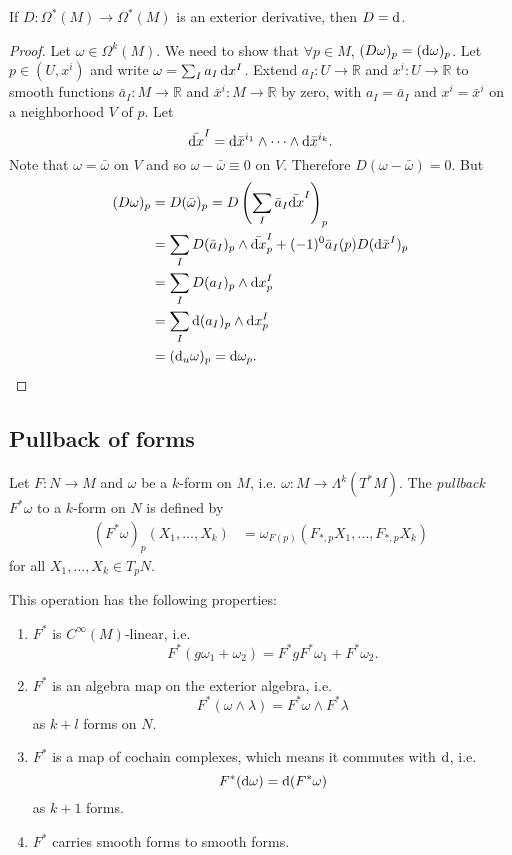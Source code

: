 \begin{prop}[Uniquenss of $D$]
If $D: \Omega^\ast(M) \to \Omega^\ast(M)$ is an exterior derivative,
then $D = \mathop{}\!\mathrm{d}$.
\end{prop}
\begin{proof}
Let $\omega \in \Omega^k(M)$. We need to show that $\forall p \in M$,
$(D\omega)_p = (\mathop{}\!\mathrm{d}\omega)_p$. Let
$p \in (U, x^i)$ and write $\omega = \sum_I a_I \mathop{}\!\mathrm{d} x^I$.
Extend $a_I : U \to \mathbb{R}$ and $x^i : U \to \mathbb{R}$ to smooth
functions $\bar{a}_I : M \to \mathbb{R}$ and $\bar{x}^i: M \to
\mathbb{R}$ by zero, with $a_I = \bar{a}_I$ and $x^i = \bar{x}^i$ on a
neighborhood $V$ of $p$. Let
$$
  \bar{\mathop{}\!\mathrm{d} x}^I
= \mathop{}\!\mathrm{d} \bar{x}^{i_1} \wedge \cdots \wedge \mathop{}\!\mathrm{d} \bar{x}^{i_k}.
$$
Note that $\omega = \bar{\omega}$ on $V$ and so
$\omega - \bar{\omega} \equiv 0$ on $V$. Therefore $D(\omega -
\bar{\omega}) = 0$. But
\begin{align*}
   (D \omega)_p
&= D(\bar{\omega})_p
 = D\left(
     \sum_I
       \bar{a}_I \bar{\dif x}^I
   \right)_p \\
&= \sum_I D(\bar{a}_I)_p \wedge \bar{\dif x}^I_p
 + (-1)^0 \bar{a}_I(p) D(\dif \bar{x}^I)_p \\
&= \sum_I
     D(a_I)_p \wedge \dif x^I_p \\
&= \sum_I
     \dif(a_I)_p \wedge \dif x^I_p \\
&= (\dif_u \omega)_p
 = \dif \omega_p.
\end{align*}
\end{proof}

\subsection{Pullback of forms}
Let $F : N \to M$ and $\omega$ be a $k$-form on $M$,
i.e. $\omega: M \to \Lambda^k(T^\ast M)$.
The \emph{pullback} $F^\ast \omega$ to a $k$-form on
$N$ is defined by
\begin{align*}
   (F^\ast\omega)_p
     (X_1, \dots, X_k)
&= \omega_{F(p)}
     (F_{\ast, p} X_1, \dots, F_{\ast, p} X_k)
\end{align*}
for all $X_1, \dots, X_k \in T_p N$.

This operation has the following properties:
\begin{enumerate}
  \item{
    $F^\ast$ is $C^\infty(M)$-linear, i.e.
    $$
      F^\ast(g \omega_1 + \omega_2)
    = F^\ast g F^\ast \omega_1 + F^\ast \omega_2.
    $$
  }
  \item{
    $F^\ast$ is an algebra map on the exterior algebra, i.e.
    $$
      F^\ast(\omega \wedge \lambda)
    = F^\ast \omega \wedge F^\ast \lambda
    $$
    as $k + l$ forms on $N$.
  }
  \item{
    $F^\ast$ is a map of cochain complexes, which means it commutes
    with $\mathop{}\!\mathrm{d}$, i.e.
    $$
      F^\ast(\mathop{}\!\mathrm{d} \omega)
    = \mathop{}\!\mathrm{d} (F^\ast \omega)
    $$
    as $k + 1$ forms.
  }
  \item{
    $F^\ast$ carries smooth forms to smooth forms.
  }
\end{enumerate}
